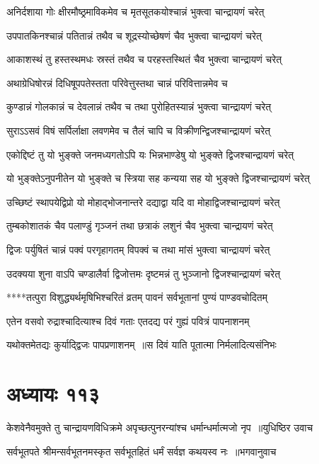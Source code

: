 \twolineshloka
{अनिर्दशाया गोः क्षीरमौष्ठ्रमाविकमेव च}
{मृतसूतकयोश्चान्नं भुक्त्वा चान्द्रायणं चरेत्}


\twolineshloka
{उपपातकिनश्चान्नं पतितान्नं तथैव च}
{शूद्रस्योच्छेषणं चैव भुक्त्वा चान्द्रायणं चरेत्}


\twolineshloka
{आकाशस्थं तु हस्तस्थमधः स्रस्तं तथैव च}
{परहस्तस्थितं चैव भुक्त्वा चान्द्रायणं चरेत्}


\twolineshloka
{अथाग्रेधिषोरन्नं दिधिषूपपतेस्तता}
{परिवेत्तुस्तथा चान्नं परिवित्तान्नमेव च}


\twolineshloka
{कुण्डान्नं गोलकान्नं च देवलान्नं तथैव च}
{तथा पुरोहितस्यान्नं भुक्त्वा चान्द्रायणं चरेत्}


\twolineshloka
{सुराऽऽसवं विषं सर्पिर्लाक्षा लवणमेव च}
{तैलं चापि च विक्रीणन्द्विजश्चान्द्रायणं चरेत्}


\twolineshloka
{एकोद्दिष्टं तु यो भुङ्क्ते जनमध्यगतोऽपि यः}
{भिन्नभाण्डेषु यो भुङ्क्ते द्विजश्चान्द्रायणं चरेत्}


\twolineshloka
{यो भुङ्क्तेऽनुपनीतेन यो भुङ्क्ते च स्त्रिया सह}
{कन्यया सह यो भुङ्क्ते द्विजश्चान्द्रायणं चरेत्}


\twolineshloka
{उच्छिष्टं स्थापयेद्विप्रो यो मोहाद्भोजनान्तरे}
{दद्याद्वा यदि वा मोहाद्विजश्चान्द्रायणं चरेत्}


\twolineshloka
{तुम्बकोशातकं चैव पलाण्डुं गृञ्जनं तथा}
{छत्राकं लशुनं चैव भुक्त्वा चान्द्रायणं चरेत्}


\twolineshloka
{द्विजः पर्युषितं चान्नं पक्वं परगृहागतम्}
{विपक्वं च तथा मांसं भुक्त्वा चान्द्रायणं चरेत्}


\twolineshloka
{उदक्यया शुना वाऽपि चण्डालैर्वा द्विजोत्तमः}
{दृष्टमन्नं तु भुञ्जानो द्विजश्चान्द्रायणं चरेत्}


\twolineshloka
{****तत्पुरा विशुद्ध्यर्थमृषिभिश्चरितं व्रतम्}
{पावनं सर्वभूतानां पुण्यं पाण्डवचोदितम्}


\twolineshloka
{एतेन वसवो रुद्राश्चादित्याश्च दिवं गताः}
{एतदद्य परं गुह्यं पवित्रं पापनाशनम्}


यथोक्तमेतद्यः कुर्याद्द्विजः पापप्रणाशनम् ॥स दिवं याति पूतात्मा निर्मलादित्यसंनिभः
\chapter{अध्यायः ११३}
\threelineshloka
{केशवेनैवमुक्ते तु चान्द्रायणविधिक्रमे}
{अपृच्छत्पुनरन्यांश्च धर्मान्धर्मात्मजो नृप ॥युधिष्ठिर उवाच}
{}


\threelineshloka
{सर्वभूतपते श्रीमन्सर्वभूतनमस्कृत}
{सर्वभूतहितं धर्मं सर्वज्ञ कथयस्व नः ॥भगवानुवाच}
{}


